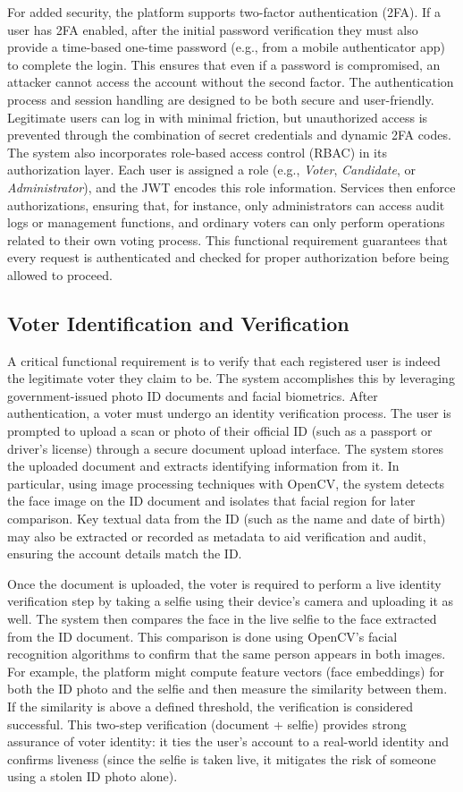 \documentclass[a4paper,10pt]{report}
\begin{document}
For added security, the platform supports two-factor authentication (2FA). If a user has 2FA enabled, after the initial password verification they must also provide a time-based one-time password (e.g., from a mobile authenticator app) to complete the login. This ensures that even if a password is compromised, an attacker cannot access the account without the second factor. The authentication process and session handling are designed to be both secure and user-friendly. Legitimate users can log in with minimal friction, but unauthorized access is prevented through the combination of secret credentials and dynamic 2FA codes. The system also incorporates role-based access control (RBAC) in its authorization layer. Each user is assigned a role (e.g., \emph{Voter}, \emph{Candidate}, or \emph{Administrator}), and the JWT encodes this role information. Services then enforce authorizations, ensuring that, for instance, only administrators can access audit logs or management functions, and ordinary voters can only perform operations related to their own voting process. This functional requirement guarantees that every request is authenticated and checked for proper authorization before being allowed to proceed.

\subsection{Voter Identification and Verification}
A critical functional requirement is to verify that each registered user is indeed the legitimate voter they claim to be. The system accomplishes this by leveraging government-issued photo ID documents and facial biometrics. After authentication, a voter must undergo an identity verification process. The user is prompted to upload a scan or photo of their official ID (such as a passport or driver’s license) through a secure document upload interface. The system stores the uploaded document and extracts identifying information from it. In particular, using image processing techniques with OpenCV, the system detects the face image on the ID document and isolates that facial region for later comparison. Key textual data from the ID (such as the name and date of birth) may also be extracted or recorded as metadata to aid verification and audit, ensuring the account details match the ID.

Once the document is uploaded, the voter is required to perform a live identity verification step by taking a selfie using their device’s camera and uploading it as well. The system then compares the face in the live selfie to the face extracted from the ID document. This comparison is done using OpenCV’s facial recognition algorithms to confirm that the same person appears in both images. For example, the platform might compute feature vectors (face embeddings) for both the ID photo and the selfie and then measure the similarity between them. If the similarity is above a defined threshold, the verification is considered successful. This two-step verification (document + selfie) provides strong assurance of voter identity: it ties the user’s account to a real-world identity and confirms liveness (since the selfie is taken live, it mitigates the risk of someone using a stolen ID photo alone).
\end{document}
